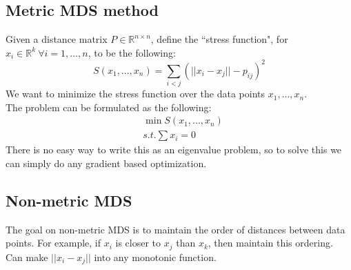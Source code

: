 \subsection{Metric MDS method}
Given a distance matrix $P \in \mathbb{R}^{n\times n}$, define the
``stress function", for $x_i \in \mathbb{R}^k \ \forall i=1,...,n$, to
be the following: 
\[
S(x_1,...,x_n) = \sum_{i<j}(||x_i-x_j||-p_{ij})^2
\]
We want to minimize the stress function over the data points $x_1,...,x_n$.\\
The problem can be formulated as the following:\\
\begin{align*}
&\min S(x_1,...,x_n)\\
&s.t. \sum x_i = 0
\end{align*}
There is no easy way to write this as an eigenvalue problem, so to
solve this we can simply do any gradient based optimization.\\ 

\subsection{Non-metric MDS}
The goal on non-metric MDS is to maintain the order of distances
between data points. For example, if $x_{i}$ is closer to $x_{j}$ than
$x_{k}$, then maintain this ordering. Can make $||x_{i} - x_{j}||$
into any monotonic function. 
